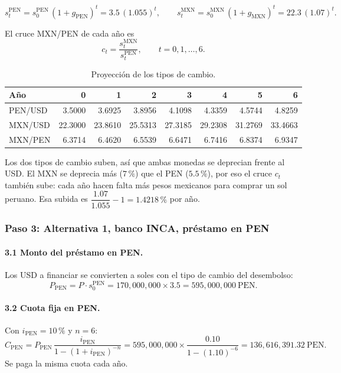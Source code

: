 \documentclass[11pt]{article}
\newcommand{\pc}{\text{\%}}
\begin{document}
\[
s^{\text{PEN}}_t=s^{\text{PEN}}_0\,(1+g_{\text{PEN}})^{t}=3.5\,(1.055)^{t},\qquad
s^{\text{MXN}}_t=s^{\text{MXN}}_0\,(1+g_{\text{MXN}})^{t}=22.3\,(1.07)^{t}.
\]

El cruce MXN/PEN de cada a\~no es
\[
c_t=\frac{s^{\text{MXN}}_t}{s^{\text{PEN}}_t},\qquad t=0,1,\dots,6 .
\]

\begin{table}[H]\centering\small
\caption{Proyecci\'on de los tipos de cambio.}\label{tab:fx}
\begin{tabular}{l r r r r r r r}\toprule
Año & 0 & 1 & 2 & 3 & 4 & 5 & 6\\\midrule
PEN/USD & 3.5000 & 3.6925 & 3.8956 & 4.1098 & 4.3359 & 4.5744 & 4.8259\\
MXN/USD & 22.3000 & 23.8610 & 25.5313 & 27.3185 & 29.2308 & 31.2769 & 33.4663\\
MXN/PEN & 6.3714 & 6.4620 & 6.5539 & 6.6471 & 6.7416 & 6.8374 & 6.9347\\
\bottomrule\end{tabular}\end{table}

Los dos tipos de cambio suben, as\'i que ambas monedas se deprecian frente al USD. El MXN se deprecia m\'as ($7\,\pc$) que el PEN ($5.5\,\pc$), por eso el cruce $c_t$ tambi\'en sube: cada a\~no hacen falta m\'as pesos mexicanos para comprar un sol peruano. Esa subida es $\dfrac{1.07}{1.055}-1=1.4218\,\pc$ por a\~no.

\subsubsection*{Paso 3: Alternativa 1, banco INCA, pr\'estamo en PEN}

\paragraph{3.1 Monto del pr\'estamo en PEN.} Los USD a financiar se convierten a soles con el tipo de cambio del desembolso:
\[
P_{\text{PEN}}=P\cdot s^{\text{PEN}}_0=170{,}000{,}000\times 3.5=595{,}000{,}000\ \text{PEN.}
\]

\paragraph{3.2 Cuota fija en PEN.} Con $i_{\text{PEN}}=10\,\pc$ y $n=6$:
\[
C_{\text{PEN}}=P_{\text{PEN}}\,\frac{i_{\text{PEN}}}{1-(1+i_{\text{PEN}})^{-n}}=595{,}000{,}000\times\frac{0.10}{1-(1.10)^{-6}}=136{,}616{,}391.32\ \text{PEN.}
\]
Se paga la misma cuota cada a\~no.
\end{document}
